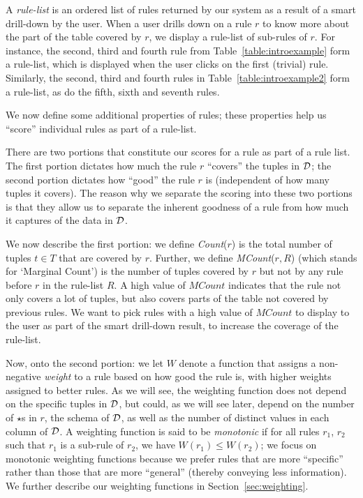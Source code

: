A {\em rule-list} is an ordered list of rules returned by our system as a result of a smart drill-down by the user. 
When a user drills down on a rule $r$ to know more about the part of the table covered by $r$, we display a rule-list of sub-rules of $r$.
For instance, the second, third and fourth rule from Table~\ref{table:introexample} form a rule-list, which is displayed when the user clicks on the first (trivial) rule. Similarly, the second, third and fourth rules in Table~\ref{table:introexample2} form a rule-list, as do the fifth, sixth and seventh rules. 

 We now define some additional properties of rules; these properties
help us ``score'' individual rules as part of a rule-list. 

There are two portions that constitute our scores for a rule as part of a rule list. 
The first portion dictates how much the rule $r$ ``covers'' the tuples in $\mathcal{D}$;
the second portion dictates how ``good'' the rule $r$ is (independent of how many
tuples it covers). 
The reason why we separate the scoring into these two portions is
that they allow us to separate the inherent goodness of a rule from
how much it captures of the data in $\mathcal{D}$.

We now describe the first portion:
we define {\em Count}($r$) is the total number of tuples $t \in T$ that are covered by $r$. 
Further, we define {\em MCount}($r, R$) (which stands for `Marginal Count') is the number of tuples covered by $r$ but not by any rule before $r$ in the rule-list $R$. A high value of $MCount$ indicates that the rule not only covers a lot of tuples, but also covers parts of the table not covered by previous rules. We want to pick rules with a high value of $MCount$ to display to the user
as part of the smart drill-down result, to increase the coverage of the rule-list. 

Now, onto the second portion: we let $W$ denote a function that assigns a non-negative {\em weight} to a rule based on how good the rule is, with higher weights assigned to better rules. 
As we will see, the weighting function does not depend on the specific
tuples in $\mathcal{D}$, but could, as we will see later, 
depend on the number of $\star$s in $r$,
the schema of $\mathcal{D}$, 
as well as the number of distinct values in each column of $\mathcal{D}$.
A weighting function is said to be {\em monotonic} if for all rules $r_1$, $r_2$ such that $r_1$ is a sub-rule of $r_2$, we have $W(r_1) \leq W(r_2)$; we focus
on monotonic weighting functions because we prefer 
rules that are more ``specific''
rather than those that are more ``general'' 
(thereby conveying less information).
We further describe our weighting functions in Section~\ref{sec:weighting}. 


